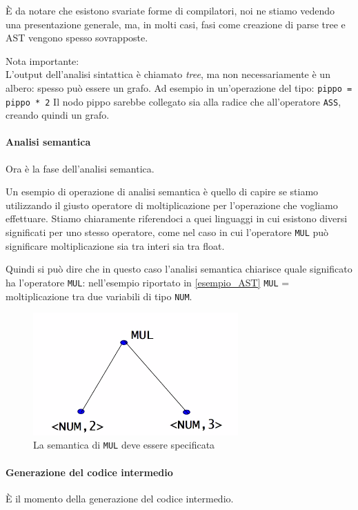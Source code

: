 \documentclass[class=book, crop=false, oneside]{standalone}
\begin{document}
È da notare che esistono svariate forme di compilatori, noi ne stiamo vedendo una presentazione generale, ma, in molti casi, fasi come creazione di parse tree e AST vengono spesso sovrapposte.

Nota importante:\\
L’output dell’analisi sintattica è chiamato \emph{tree}, ma non necessariamente è un albero: spesso può essere un grafo. Ad esempio in un’operazione del tipo:
\texttt{pippo = pippo * 2}
Il nodo pippo sarebbe collegato sia alla radice che all’operatore \texttt{ASS}, creando quindi un grafo.

\paragraph{Analisi semantica}
Ora è la fase dell’analisi semantica.

Un esempio di operazione di analisi semantica è quello di capire se stiamo utilizzando il giusto operatore di moltiplicazione per l’operazione che vogliamo effettuare. Stiamo chiaramente riferendoci a quei linguaggi in cui esistono diversi significati per uno stesso operatore, come nel caso in cui l'operatore \texttt{MUL} può significare moltiplicazione sia tra interi sia tra float.

Quindi si può dire che in questo caso l’analisi semantica chiarisce quale significato ha l’operatore \texttt{MUL}: nell’esempio riportato in \ref{esempio_AST} \texttt{MUL} = moltiplicazione tra due variabili di tipo \texttt{NUM}.
\begin{figure}[H]
	\centering
	\includegraphics[width=0.7\textwidth,keepaspectratio]{semantic_analysis}
	\caption{La semantica di \texttt{MUL} deve essere specificata}
\end{figure}

\paragraph{Generazione del codice intermedio}
È il momento della generazione del codice intermedio.
\end{document}
